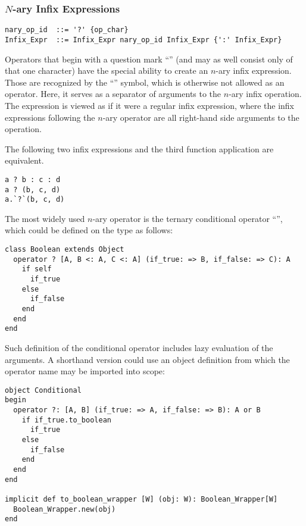 \subsubsection{$N$-ary Infix Expressions}
\label{sec:nary-infix-expressions}

\syntax\begin{lstlisting}
nary_op_id  ::= '?' {op_char}
Infix_Expr  ::= Infix_Expr nary_op_id Infix_Expr {':' Infix_Expr}
\end{lstlisting}

Operators that begin with a question mark ``'' (and may as well consist only of that one character) have the special ability to create an $n$-ary infix expression. Those are recognized by the ``\code{:}'' symbol, which is otherwise not allowed as an operator. Here, it serves as a separator of arguments to the $n$-ary infix operation. The expression is viewed as if it were a regular infix expression, where the infix expressions following the $n$-ary operator are all right-hand side arguments to the operation. 

The following two infix expressions and the third function application are equivalent.
\begin{lstlisting}
a ? b : c : d
a ? (b, c, d)
a.`?`(b, c, d)
\end{lstlisting}

\example The most widely used $n$-ary operator is the ternary conditional operator ``'', which could be defined on the  type as follows:

\begin{lstlisting}
class Boolean extends Object
  operator ? [A, B <: A, C <: A] (if_true: => B, if_false: => C): A
    if self
      if_true
    else
      if_false
    end
  end
end
\end{lstlisting}

Such definition of the conditional operator includes lazy evaluation of the arguments. A shorthand version could use an object definition from which the operator name may be imported into scope:

\begin{lstlisting}
object Conditional
begin
  operator ?: [A, B] (if_true: => A, if_false: => B): A or B
    if if_true.to_boolean
      if_true
    else
      if_false
    end
  end
end

implicit def to_boolean_wrapper [W] (obj: W): Boolean_Wrapper[W]
  Boolean_Wrapper.new(obj)
end
\end{lstlisting}

